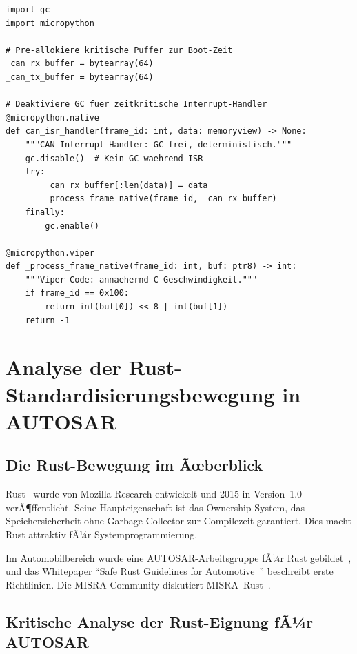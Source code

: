 ﻿\documentclass[12pt,a4paper,twoside]{article}
\begin{document}
\begin{lstlisting}[language=MicroPython,caption={MicroPython Speichermanagement fÃ¼r zeitkritische Funktionen},label=lst:gc_control]
import gc
import micropython

# Pre-allokiere kritische Puffer zur Boot-Zeit
_can_rx_buffer = bytearray(64)
_can_tx_buffer = bytearray(64)

# Deaktiviere GC fuer zeitkritische Interrupt-Handler
@micropython.native
def can_isr_handler(frame_id: int, data: memoryview) -> None:
    """CAN-Interrupt-Handler: GC-frei, deterministisch."""
    gc.disable()  # Kein GC waehrend ISR
    try:
        _can_rx_buffer[:len(data)] = data
        _process_frame_native(frame_id, _can_rx_buffer)
    finally:
        gc.enable()

@micropython.viper
def _process_frame_native(frame_id: int, buf: ptr8) -> int:
    """Viper-Code: annaehernd C-Geschwindigkeit."""
    if frame_id == 0x100:
        return int(buf[0]) << 8 | int(buf[1])
    return -1
\end{lstlisting}

\section{Analyse der Rust-Standardisierungsbewegung in AUTOSAR}
\label{sec:rust_analyse}

\subsection{Die Rust-Bewegung im Ãœberblick}
Rust~\cite{rust_book2022} wurde von Mozilla Research entwickelt und 2015
in Version~1.0 verÃ¶ffentlicht. Seine Haupteigenschaft ist das Ownership-System,
das Speichersicherheit ohne Garbage Collector zur Compilezeit garantiert.
Dies macht Rust attraktiv fÃ¼r Systemprogrammierung.

Im Automobilbereich wurde eine AUTOSAR-Arbeitsgruppe fÃ¼r Rust gebildet~\cite{autosar_wg_rustsafety},
und das Whitepaper ``Safe Rust Guidelines for Automotive~\cite{autosar_rust_wp2023}''
beschreibt erste Richtlinien. Die MISRA-Community diskutiert MISRA~Rust~\cite{misra_rust2022}.

\subsection{Kritische Analyse der Rust-Eignung fÃ¼r AUTOSAR}
\label{subsec:rust_kritik}
\end{document}
